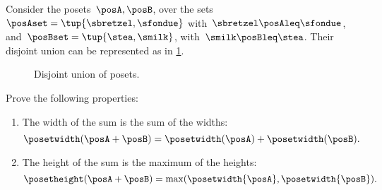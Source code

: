 \begin{example}
	Consider the posets~$\posA,\posB$, over the sets~$\posAset=\tup{\sbretzel, \sfondue}$ with~$\sbretzel \posAleq \sfondue$, and~$\posBset=\tup{\stea,\smilk}$, with~$\smilk \posBleq \stea$.
	Their disjoint union can be represented as in \cref{fig:poset-coproduct}.

	\begin{figure}[h!]
		\centering
		\caption{Disjoint union of posets.}
		\label{fig:poset-coproduct}
	\end{figure}
\end{example}
\vfill
\begin{gradedexercise}
	Prove the following properties:
	\begin{enumerate}
		\item The width of the sum is the sum of the widths:
		      \begin{equation}
			      \posetwidth(\posA + \posB) = \posetwidth(\posA) + \posetwidth(\posB).
		      \end{equation}
		\item The height of the sum is the maximum of the heights:
		      \begin{equation}
			      \posetheight(\posA + \posB) = \max(\posetwidth{\posA}, \posetwidth{\posB}).
		      \end{equation}
	\end{enumerate}
\end{gradedexercise}
